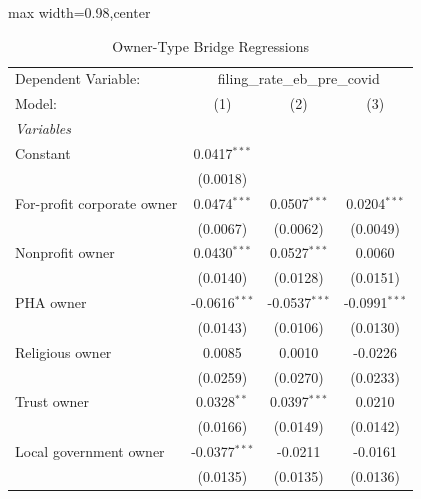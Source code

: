 
\begin{table}[htbp]
   \caption{\label{tab:owner_bridge} Owner-Type Bridge Regressions}
   \centering
   \scriptsize
   \begin{adjustbox}{max width=0.98\textwidth,center}
      \begin{tabular}{lccc}
         \tabularnewline \midrule \midrule
         Dependent Variable: & \multicolumn{3}{c}{filing\_rate\_eb\_pre\_covid}\\
         Model:                                  & (1)             & (2)             & (3)\\  
         \midrule
         \emph{Variables}\\
         Constant                                & 0.0417$^{***}$  &                 &   \\   
                                                 & (0.0018)        &                 &   \\   
         For-profit corporate owner              & 0.0474$^{***}$  & 0.0507$^{***}$  & 0.0204$^{***}$\\   
                                                 & (0.0067)        & (0.0062)        & (0.0049)\\   
         Nonprofit owner                         & 0.0430$^{***}$  & 0.0527$^{***}$  & 0.0060\\   
                                                 & (0.0140)        & (0.0128)        & (0.0151)\\   
         PHA owner                               & -0.0616$^{***}$ & -0.0537$^{***}$ & -0.0991$^{***}$\\   
                                                 & (0.0143)        & (0.0106)        & (0.0130)\\   
         Religious owner                         & 0.0085          & 0.0010          & -0.0226\\   
                                                 & (0.0259)        & (0.0270)        & (0.0233)\\   
         Trust owner                             & 0.0328$^{**}$   & 0.0397$^{***}$  & 0.0210\\   
                                                 & (0.0166)        & (0.0149)        & (0.0142)\\   
         Local government owner                  & -0.0377$^{***}$ & -0.0211         & -0.0161\\   
                                                 & (0.0135)        & (0.0135)        & (0.0136)\\   

\end{tabular}
\end{adjustbox}
\end{table}
